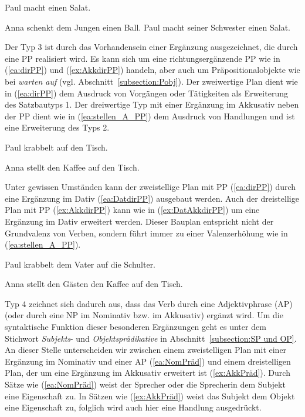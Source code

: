 \ea \label{ea: N-A}  
\ea \label{ex:machtSalat} Paul macht einen Salat.
\z 
\z 

 
\ea \label{ex:N-D-A} 
\ea \label{ex:schenktD_A} Anna schenkt dem Jungen einen Ball.
\ex \label{ex:N-D-A-Ausbau} Paul macht seiner Schwester einen Salat.
\z 
\z 

\largerpage
Der Typ 3 ist durch das Vorhandensein einer Ergänzung ausgezeichnet, die durch eine PP realisiert wird. Es kann sich um eine richtungsergänzende PP wie in (\ref{ea:dirPP}) und (\ref{ex:AkkdirPP}) handeln, aber auch um Präpositionalobjekte wie bei \textit{warten auf} (vgl. Abschnitt~\ref{subsection:Pobj}). Der zweiwertige Plan dient wie in (\ref{ea:dirPP}) dem Ausdruck von Vorgängen oder Tätigkeiten als Erweiterung des Satzbautyps 1. Der dreiwertige Typ mit einer Ergänzung im Akkusativ neben der PP dient wie in (\ref{ea:stellen_A_PP}) dem Ausdruck von Handlungen und ist eine Erweiterung des Typs 2.


\ea \label{ea:dirPP}  
\ea \label{ea:krabbeln_PP} Paul krabbelt auf den Tisch.
\z 
\z 


\ea \label{ex:AkkdirPP} 
\ea \label{ea:stellen_A_PP} Anna stellt den Kaffee auf den Tisch.
\z 
\z 

Unter gewissen Umständen kann der zweistellige Plan mit PP (\ref{ea:dirPP}) durch eine Ergänzung im Dativ  (\ref{ea:DatdirPP}) ausgebaut werden. Auch der dreistellige Plan mit PP (\ref{ex:AkkdirPP}) kann wie in (\ref{ex:DatAkkdirPP}) um eine Ergänzung im Dativ erweitert werden. Dieser Bauplan entspricht nicht der Grundvalenz von Verben, sondern führt immer zu einer Valenzerhöhung wie in (\ref{ea:stellen_A_PP}).

 
\ea \label{ea:DatdirPP} 
\ea \label{ea:krabbeln_Dat_PP} Paul krabbelt dem Vater auf die Schulter.
\z 
\z 

\ea \label{ex:DatAkkdirPP} 
\ea \label{ex:stellt_D_A_PP} Anna stellt den Gästen den Kaffee auf den Tisch.
\z
\z 

Typ 4 zeichnet sich dadurch aus, dass das Verb durch eine Adjektivphrase (AP) (oder durch eine NP im Nominativ bzw. im Akkusativ) ergänzt wird. Um die syntaktische Funktion dieser besonderen Ergänzungen geht es unter dem Stichwort \textit{Subjekts}- und \textit{Objektsprädikative} in Abschnitt~\ref{subsection:SP und OP}. An dieser Stelle unterscheiden wir zwischen einem zweistelligen Plan mit einer Ergänzung im Nominativ und einer AP (\ref{ea:NomPräd}) und einem dreistelligen Plan, der um eine Ergänzung im Akkusativ erweitert ist (\ref{ex:AkkPräd}). Durch Sätze wie (\ref{ea:NomPräd}) weist der Sprecher oder die Sprecherin dem Subjekt eine Eigenschaft zu. In Sätzen wie (\ref{ex:AkkPräd}) weist das Subjekt dem Objekt eine Eigenschaft zu, folglich wird auch hier eine Handlung ausgedrückt.



